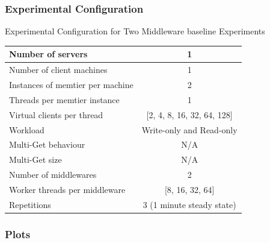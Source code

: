 \documentclass[11pt,a4paper]{article}
\begin{document}
\subsubsection{Experimental Configuration}
\begin{center}
	\scriptsize{
		Experimental Configuration for Two Middleware baseline Experiments
		\begin{tabular}{|l|c|}
			\hline Number of servers                & 1                          \\ 
			\hline Number of client machines        & 1                          \\ 
			\hline Instances of memtier per machine & 2                          \\ 
			\hline Threads per memtier instance     & 1                          \\
			\hline Virtual clients per thread       & [2, 4, 8, 16, 32, 64, 128] \\ 
			\hline Workload                         & Write-only and Read-only   \\
			\hline Multi-Get behaviour               & N/A                        \\
			\hline Multi-Get size                   & N/A                        \\
			\hline Number of middlewares            & 2                          \\
			\hline Worker threads per middleware    & [8, 16, 32, 64]            \\
			\hline Repetitions                      & 3 (1 minute steady state)  \\ 
			\hline 
		\end{tabular}
	} 
\end{center}

\subsubsection{Plots}
\end{document}
